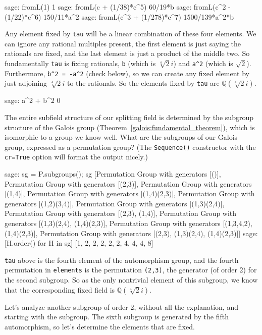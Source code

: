%
\begin{sageexample}
sage: fromL(1)
1
sage: fromL(c + (1/38)*c^5)
60/19*b
sage: fromL(c^2 - (1/22)*c^6)
150/11*a^2
sage: fromL(c^3 + (1/278)*c^7)
1500/139*a^2*b
\end{sageexample}
%
Any element fixed by \verb?tau? will be a linear combination of these four elements.  We can ignore any rational multiples present, the first element is just saying the rationals are fixed, and the last element is just a product of the middle two.  So fundamentally \verb?tau? is fixing rationals, \verb?b? (which is $\sqrt[4]{2}i$) and \verb?a^2? (which is $\sqrt{2}$).  Furthermore, \verb?b^2 = -a^2? (check below), so we can create any fixed element by just adjoining $\sqrt[4]{2}i$ to the rationals.  So the elements fixed by \verb?tau? are ${\mathbb Q}(\sqrt[4]{2}i)$.
%
\begin{sageexample}
sage: a^2 + b^2
0
\end{sageexample}
%
%
%
The entire subfield structure of our splitting field is determined by the subgroup structure of the Galois group (Theorem~\ref{galois:fundamental_theorem}), which is isomorphic to a group we know well.  What are the subgroups of our Galois group, expressed as a permutation group? (The \verb?Sequence()? constructor with the \verb?cr=True? option will format the output nicely.)
%
\begin{sageexample}
sage: sg = P.subgroups(); sg
[Permutation Group with generators [()], 
 Permutation Group with generators [(2,3)], 
 Permutation Group with generators [(1,4)], 
 Permutation Group with generators [(1,4)(2,3)], 
 Permutation Group with generators [(1,2)(3,4)], 
 Permutation Group with generators [(1,3)(2,4)], 
 Permutation Group with generators [(2,3), (1,4)], 
 Permutation Group with generators [(1,3)(2,4), (1,4)(2,3)], 
 Permutation Group with generators [(1,3,4,2), (1,4)(2,3)], 
 Permutation Group with generators [(2,3), (1,3)(2,4), (1,4)(2,3)]]
sage: [H.order() for H in sg]
[1, 2, 2, 2, 2, 2, 4, 4, 4, 8]
\end{sageexample}
%
\verb?tau? above is the fourth element of the automorphism group, and the fourth permutation in \verb?elements? is the permutation \verb?(2,3)?, the generator (of order 2) for the second subgroup.  So as the only nontrivial element of this subgroup, we know that the corresponding fixed field is ${\mathbb Q}(\sqrt[4]{2}i)$.\par
%
Let's analyze another subgroup of order 2, without all the explanation, and starting with the subgroup.  The sixth subgroup is generated by the fifth automorphism, so let's determine the elements that are fixed.
